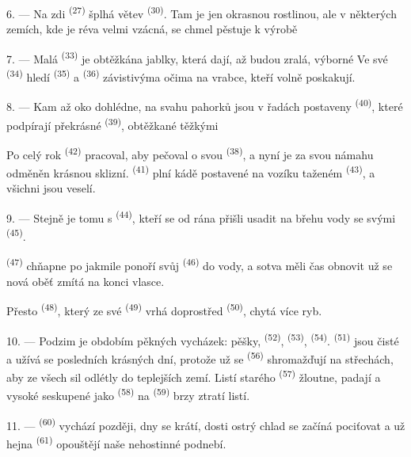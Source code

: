 6. --- Na zdi  \textsuperscript{(27)} šplhá větev 
\textsuperscript{(30)}. Tam je jen okrasnou rostlinou, ale v některých zemích, kde je réva
velmi vzácná, se chmel pěstuje k výrobě 

7. --- Malá  \textsuperscript{(33)} je obtěžkána jablky, která dají, až budou
zralá, výborné  Ve své  \textsuperscript{(34)} hledí
 \textsuperscript{(35)} a  \textsuperscript{(36)} závistivýma
očima na vrabce, kteří volně poskakují.

8. --- Kam až oko dohlédne, na svahu pahorků jsou v řadách postaveny 
\textsuperscript{(40)}, které podpírají překrásné  \textsuperscript{(39)},
obtěžkané těžkými 

Po celý rok  \textsuperscript{(42)} pracoval, aby pečoval o svou
 \textsuperscript{(38)}, a nyní je za svou námahu odměněn krásnou
sklizní.  \textsuperscript{(41)} plní kádě postavené na vozíku taženém
 \textsuperscript{(43)}, a všichni jsou veselí.

\VUsaut{5.0mm}
\VUsaut{3.4mm}

9. --- Stejně je tomu s  \textsuperscript{(44)}, kteří se od rána
přišli usadit na břehu vody se svými  \textsuperscript{(45)}.

 \textsuperscript{(47)} chňapne po  jakmile ponoří svůj
 \textsuperscript{(46)} do vody, a sotva měli čas obnovit
 už se nová oběť zmítá na konci vlasce.

Přesto  \textsuperscript{(48)}, který ze své 
\textsuperscript{(49)} vrhá  doprostřed 
\textsuperscript{(50)}, chytá více ryb.

10. --- Podzim je obdobím pěkných vycházek: pěšky,  \textsuperscript{(52)},
 \textsuperscript{(53)},  \textsuperscript{(54)}. 
\textsuperscript{(51)} jsou čisté a užívá se posledních krásných dní, protože už se
 \textsuperscript{(56)} shromažďují na střechách, aby ze všech sil odlétly
do teplejších zemí. Listí starého  \textsuperscript{(57)} žloutne,
 padají a vysoké  seskupené jako 
\textsuperscript{(58)} na  \textsuperscript{(59)} brzy ztratí listí.

11. ---  \textsuperscript{(60)} vychází později, dny se krátí, dosti ostrý
chlad se začíná pociťovat  a už hejna  \textsuperscript{(61)}
opouštějí naše nehostinné podnebí.
